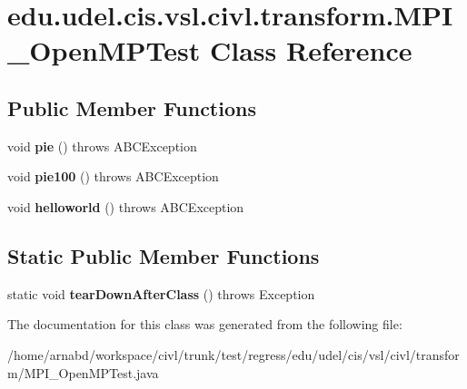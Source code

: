 \hypertarget{classedu_1_1udel_1_1cis_1_1vsl_1_1civl_1_1transform_1_1MPI__OpenMPTest}{}\section{edu.\+udel.\+cis.\+vsl.\+civl.\+transform.\+M\+P\+I\+\_\+\+Open\+M\+P\+Test Class Reference}
\label{classedu_1_1udel_1_1cis_1_1vsl_1_1civl_1_1transform_1_1MPI__OpenMPTest}
\subsection*{Public Member Functions}
\begin{DoxyCompactItemize}
\item 
\hypertarget{classedu_1_1udel_1_1cis_1_1vsl_1_1civl_1_1transform_1_1MPI__OpenMPTest_ac13fed2b1315ddf0f84e45a3803709c3}{}void {\bfseries pie} ()  throws A\+B\+C\+Exception \label{classedu_1_1udel_1_1cis_1_1vsl_1_1civl_1_1transform_1_1MPI__OpenMPTest_ac13fed2b1315ddf0f84e45a3803709c3}

\item 
\hypertarget{classedu_1_1udel_1_1cis_1_1vsl_1_1civl_1_1transform_1_1MPI__OpenMPTest_a97ae074af2705ae2ea0be8b2e0636ef5}{}void {\bfseries pie100} ()  throws A\+B\+C\+Exception \label{classedu_1_1udel_1_1cis_1_1vsl_1_1civl_1_1transform_1_1MPI__OpenMPTest_a97ae074af2705ae2ea0be8b2e0636ef5}

\item 
\hypertarget{classedu_1_1udel_1_1cis_1_1vsl_1_1civl_1_1transform_1_1MPI__OpenMPTest_a21ba0725d05fbbcb87a64dd782b7ffc4}{}void {\bfseries helloworld} ()  throws A\+B\+C\+Exception \label{classedu_1_1udel_1_1cis_1_1vsl_1_1civl_1_1transform_1_1MPI__OpenMPTest_a21ba0725d05fbbcb87a64dd782b7ffc4}

\end{DoxyCompactItemize}
\subsection*{Static Public Member Functions}
\begin{DoxyCompactItemize}
\item 
\hypertarget{classedu_1_1udel_1_1cis_1_1vsl_1_1civl_1_1transform_1_1MPI__OpenMPTest_a2e7493aad90c0d6e081125ebba91a868}{}static void {\bfseries tear\+Down\+After\+Class} ()  throws Exception \label{classedu_1_1udel_1_1cis_1_1vsl_1_1civl_1_1transform_1_1MPI__OpenMPTest_a2e7493aad90c0d6e081125ebba91a868}

\end{DoxyCompactItemize}


The documentation for this class was generated from the following file\+:\begin{DoxyCompactItemize}
\item 
/home/arnabd/workspace/civl/trunk/test/regress/edu/udel/cis/vsl/civl/transform/M\+P\+I\+\_\+\+Open\+M\+P\+Test.\+java\end{DoxyCompactItemize}
